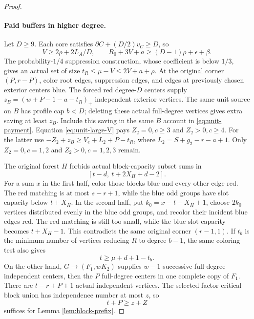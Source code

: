 \documentclass[11pt,a4paper]{article}
\theoremstyle{definition}
\begin{document}
\begin{proof}
\paragraph{Paid buffers in higher degree.}
Let $D\ge9$. Each core satisfies $\partial C+(D/2)v_C\ge D$, so
\begin{equation}\label{eq:unit-large-V}
 V\ge2\rho+2L_A/D,\qquad
 R_0+3V+a\ge(D-1)\rho+\epsilon+\beta.
\end{equation}
The probability-$1/4$ suppression construction, whose coefficient is below $1/3$, gives an actual set of size
$t_R\le\mu-V\le2V+a+\rho$.
At the original corner $(P,r-P)$, color root edges, suppression edges, and edges at previously chosen exterior centers blue. The forced red degree-$D$ centers supply
$z_B=(w+P-1-a-t_R)_+$ independent exterior vertices.
The same unit source on $B$ has profile cap $b<D$; deleting these actual full-degree vertices gives extra saving at least $z_B$.
Include this saving in the same $B$ account in \eqref{eq:unit-payment}.
Equation \eqref{eq:unit-large-V} pays $Z_2=0,c\ge3$ and $Z_2>0,c\ge4$.
For the latter use $-Z_2+z_B\ge V_e+L_2+P-t_R$, where $L_2=S+g_2-r-a+1$.
Only $Z_2=0,c=1,2$ and $Z_2>0,c=1,2,3$ remain.

The original forest $H$ forbids actual block-capacity subset sums in
\begin{equation}\label{eq:unit-forbidden}
 [t-d,\ t+2X_H+d-2].
\end{equation}
For a sum $x$ in the first half, color those blocks blue and every other edge red. The red matching is at most $s-r+1$, while the blue odd groups have slot capacity below $t+X_H$.
In the second half, put $k_0=x-t-X_H+1$, choose $2k_0$ vertices distributed evenly in the blue odd groups, and recolor their incident blue edges red.
The red matching is still too small, while the blue slot capacity becomes $t+X_H-1$.
This contradicts the same original corner $(r-1,1)$.
If $t_b$ is the minimum number of vertices reducing $R$ to degree $b-1$, the same coloring test also gives
\[
 t\ge\mu+d+1-t_b.
\]
On the other hand, $G\to(F_1,wK_2)$ supplies $w-1$ successive full-degree independent centers, then the $P$ full-degree centers in one complete copy of $F_1$.
There are $t-r+P+1$ actual independent vertices.
The selected factor-critical block union has independence number at most $z$, so
\begin{equation}\label{eq:unit-buffer-success}
 t+P\ge z+Z
\end{equation}
suffices for Lemma \ref{lem:block-prefix}.


\end{proof}
\end{document}
